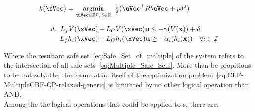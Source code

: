 \begin{equation}
    \begin{array}{l}
        k(\xVec) = \underset{\uVec \in \mathbb{R}^p, \hspace{0.2em} \delta \in \mathbb{R}}{\mathrm{argmin}} \quad \hspace{-0.5em} \frac{1}{2} (\uVec^\top R \uVec + p\delta^2 ) \vspace{1em} \\ 
        \quad \hspace{0.5em}  st. \hspace{0.5em} L_fV(\xVec) + L_GV(\xVec)\mathbf{u} \leq -\gamma(V(\mathbf{x})) + \delta \vspace{0.25em}\\
        \quad \quad \hspace{1em}                 L_fh_i(\xVec) + L_Gh_i(\xVec)\mathbf{u} \geq -\alpha_i(h_i(\mathbf{x}))  \quad \forall i \in \mathcal{I}    
    \end{array}
 \label{eq:CLF-MultipleCBF-QP-relaxed-generic}
\end{equation}

Where the resultant safe set~\ref{eq:Safe_Set_of_multiple} of the system refers to the intersection of all safe sets~\ref{eq:Multiple_Safe_Sets}. More than be propitious to be not solvable, the formulation itself of the optimization problem~\ref{eq:CLF-MultipleCBF-QP-relaxed-generic} is limitated by no other logical operation than AND. \\

Among the the logical operations that could be applied to s, there are:

